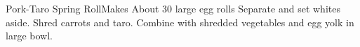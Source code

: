 \documentclass[]{article}
\title{}
\author{}
\begin{document}
\begin{recipe}{Pork-Taro Spring Roll}{}{Makes About 30 large egg rolls}
	Separate and set whites aside. 
	Shred carrots and taro. 
	Combine with shredded vegetables and egg yolk in large bowl. 
\end{recipe}
\end{document}
